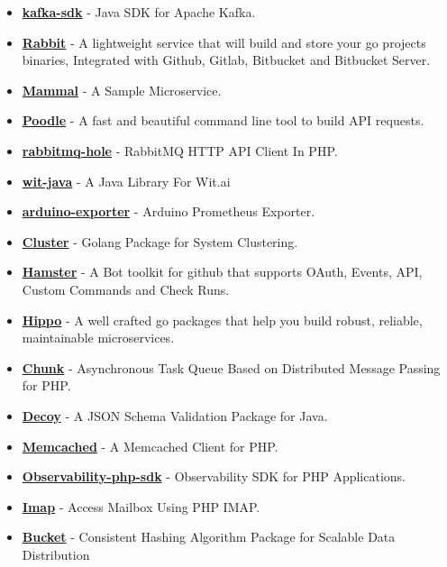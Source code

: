 \documentclass[paper=a4,fontsize=11pt]{scrartcl} %
\begin{document}
\begin{itemize}
\item \textbf{\href{https://github.com/Clivern/kafka-sdk}{kafka-sdk}} - Java SDK for Apache Kafka.
\item \textbf{\href{https://github.com/Clivern/Rabbit}{Rabbit}} - A lightweight service that will build and store your go projects binaries, Integrated with Github, Gitlab, Bitbucket and Bitbucket Server.
\item \textbf{\href{https://github.com/Clivern/Mammal}{Mammal}} - A Sample Microservice.
\item \textbf{\href{https://github.com/Clivern/Poodle}{Poodle}} - A fast and beautiful command line tool to build API requests.
\item \textbf{\href{https://github.com/Clivern/rabbitmq-hole}{rabbitmq-hole}} - RabbitMQ HTTP API Client In PHP.
\item \textbf{\href{https://github.com/Clivern/wit-java}{wit-java}} - A Java Library For Wit.ai
\item \textbf{\href{https://github.com/Clivern/arduino_exporter}{arduino-exporter}} - Arduino Prometheus Exporter.
\item \textbf{\href{https://github.com/Clivern/Cluster}{Cluster}} - Golang Package for System Clustering.
\item \textbf{\href{https://github.com/Clivern/Hamster}{Hamster}} - A Bot toolkit for github that supports OAuth, Events, API, Custom Commands and Check Runs.
\item \textbf{\href{https://github.com/Clivern/Hippo}{Hippo}} - A well crafted go packages that help you build robust, reliable, maintainable microservices.
\item \textbf{\href{https://github.com/Clivern/Chunk}{Chunk}} - Asynchronous Task Queue Based on Distributed Message Passing for PHP.
\item \textbf{\href{https://github.com/Clivern/Decoy}{Decoy}} - A JSON Schema Validation Package for Java.
\item \textbf{\href{https://github.com/Clivern/Memcached}{Memcached}} - A Memcached Client for PHP.
\item \textbf{\href{https://github.com/Clivern/Observability-php-sdk}{Observability-php-sdk}} - Observability SDK for PHP Applications.
\item \textbf{\href{https://github.com/Clivern/Imap}{Imap}} - Access Mailbox Using PHP IMAP.
\item \textbf{\href{https://github.com/Clivern/Bucket}{Bucket}} - Consistent Hashing Algorithm Package for Scalable Data Distribution

\end{itemize}
\end{document}
